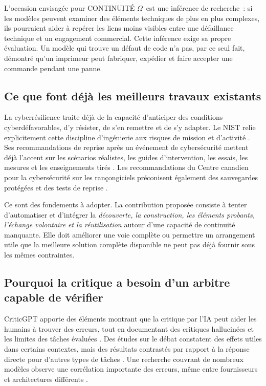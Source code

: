 \documentclass[11pt,a4paper]{article}
\newcommand{\om}{CONTINUITÉ $\Omega$}
\begin{document}
L’occasion envisagée pour \om\ est une inférence de recherche~: si les modèles peuvent examiner des éléments techniques de plus en plus complexes, ils pourraient aider à repérer les liens moins visibles entre une défaillance technique et un engagement commercial. Cette inférence exige sa propre évaluation. Un modèle qui trouve un défaut de code n’a pas, par ce seul fait, démontré qu’un imprimeur peut fabriquer, expédier et faire accepter une commande pendant une panne.

\subsection{Ce que font déjà les meilleurs travaux existants}
La cyberrésilience traite déjà de la capacité d’anticiper des conditions cyberdéfavorables, d’y résister, de s’en remettre et de s’y adapter. Le NIST relie explicitement cette discipline d’ingénierie aux risques de mission et d’activité \cite{nist160}. Ses recommandations de reprise après un événement de cybersécurité mettent déjà l’accent sur les scénarios réalistes, les guides d’intervention, les essais, les mesures et les enseignements tirés \cite{nist184}. Les recommandations du Centre canadien pour la cybersécurité sur les rançongiciels préconisent également des sauvegardes protégées et des tests de reprise \cite{canadaRansomware}.

Ce sont des fondements à adopter. La contribution proposée consiste à tenter d’automatiser et d’intégrer la \emph{découverte, la construction, les éléments probants, l’échange volontaire et la réutilisation} autour d’une capacité de continuité manquante. Elle doit améliorer une voie complète ou permettre un arrangement utile que la meilleure solution complète disponible ne peut pas déjà fournir sous les mêmes contraintes.

\subsection{Pourquoi la critique a besoin d’un arbitre capable de vérifier}
CriticGPT apporte des éléments montrant que la critique par l’IA peut aider les humains à trouver des erreurs, tout en documentant des critiques hallucinées et les limites des tâches évaluées \cite{criticGPT}. Des études sur le débat constatent des effets utiles dans certains contextes, mais des résultats contrastés par rapport à la réponse directe pour d’autres types de tâches \cite{kenton}. Une recherche couvrant de nombreux modèles observe une corrélation importante des erreurs, même entre fournisseurs et architectures différents \cite{correlated}.
\end{document}
